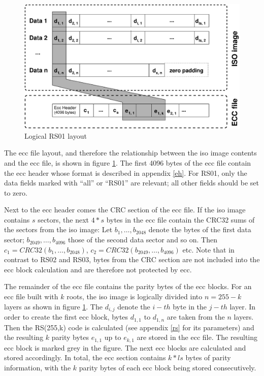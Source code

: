 \begin{figure}
 \begin{center}
 \includegraphics[width=\textwidth]{rs01-layout.eps}
 \caption{Logical RS01 layout}
 \label{layout-logical-one}
 \end{center}
\end{figure}

The ecc file layout, and therefore the relationship between the iso image
contents and the ecc file, is shown in 
figure \ref{layout-logical-one}. The first 4096 bytes of the ecc file
contain the ecc header whose format is described in appendix \ref{eh}.
For RS01, only the data fields marked with ``all'' or ``RS01'' are
relevant; all other fields should be set to zero.

Next to the ecc header comes the CRC section of the ecc file. If the
iso image contains $s$ sectors, the next $4*s$ bytes in the ecc file
contain the CRC32 sums of the sectors from the iso image: Let $b_1,\dots,b_{2048}$ denote 
the bytes of the first data sector; $b_{2049},\dots,b_{4096}$ those of the
second data sector and so on. Then $c_1 = CRC32(b_1,\dots,b_{2048})$,
$c_2 = CRC32(b_{2049},\dots,b_{4096})$ etc. Note that in contrast to
RS02 and RS03, bytes from the CRC section are not included into the ecc block
calculation and are therefore not protected by ecc.

\smallskip

The remainder of the ecc file contains the parity bytes of the
ecc blocks. For an ecc file built with $k$ roots, 
the iso image is logically divided into 
$n = 255-k$ layers as shown in figure \ref{layout-logical-one}.
The $d_{i,j}$ denote the $i-th$ byte in the $j-th$ layer.
In order to create the first ecc block, bytes $d_{1,1}$ to  $d_{1,n}$ are taken from the
$n$ layers. Then the RS(255,k) code is calculated (see appendix \ref{rs} for its parameters)
and the 
resulting $k$ parity bytes $e_{1,1}$ up to $e_{k,1}$ are stored
in the ecc file. The resulting ecc block is marked grey in the
figure. The next ecc blocks are calculated and stored accordingly.
In total, the ecc section contains $k*ls$ bytes of parity information,
with the $k$ parity bytes of each ecc block being stored consecutively.


